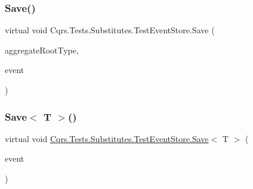 \mbox{\label{classCqrs_1_1Tests_1_1Substitutes_1_1TestEventStore_ac5f756c50e6af8df69313cd24f1c69f5}} 
\subsubsection{\texorpdfstring{Save()}{Save()}}
{\footnotesize\ttfamily virtual void Cqrs.\+Tests.\+Substitutes.\+Test\+Event\+Store.\+Save (\begin{DoxyParamCaption}\item[{Type}]{aggregate\+Root\+Type,  }\item[{\hyperlink{interfaceCqrs_1_1Events_1_1IEvent}{I\+Event}$<$ \hyperlink{interfaceCqrs_1_1Authentication_1_1ISingleSignOnToken}{I\+Single\+Sign\+On\+Token} $>$ @}]{event }\end{DoxyParamCaption})\hspace{0.3cm}{\ttfamily [virtual]}}

\mbox{\label{classCqrs_1_1Tests_1_1Substitutes_1_1TestEventStore_ab727c96e0f9a36729c1e10fabbef969f}} 
\subsubsection{\texorpdfstring{Save$<$ T $>$()}{Save< T >()}}
{\footnotesize\ttfamily virtual void \hyperlink{classCqrs_1_1Tests_1_1Substitutes_1_1TestEventStore_ac5f756c50e6af8df69313cd24f1c69f5}{Cqrs.\+Tests.\+Substitutes.\+Test\+Event\+Store.\+Save}$<$ T $>$ (\begin{DoxyParamCaption}\item[{\hyperlink{interfaceCqrs_1_1Events_1_1IEvent}{I\+Event}$<$ \hyperlink{interfaceCqrs_1_1Authentication_1_1ISingleSignOnToken}{I\+Single\+Sign\+On\+Token} $>$ @}]{event }\end{DoxyParamCaption})\hspace{0.3cm}{\ttfamily [virtual]}}



